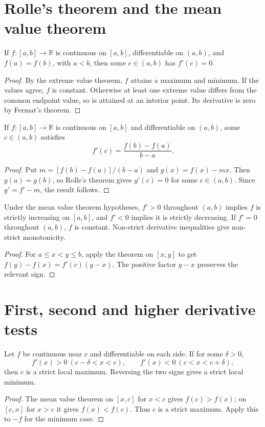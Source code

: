 \section{Rolle's theorem and the mean value theorem}
\begin{theorem}
If $f:[a,b]\to\mathbb R$ is continuous on $[a,b]$, differentiable on
$(a,b)$, and $f(a)=f(b)$, with $a<b$, then some $c\in(a,b)$ has $f'(c)=0$.
\end{theorem}
\begin{proof}
By the extreme value theorem, $f$ attains a maximum and minimum.
If the values agree, $f$ is constant. Otherwise at least one extreme
value differs from the common endpoint value, so is attained at an
interior point. Its derivative is zero by Fermat's theorem.
\end{proof}

\begin{theorem}\label{thm:analysis-mvt}
If $f:[a,b]\to\mathbb R$ is continuous on $[a,b]$ and differentiable on
$(a,b)$, some $c\in(a,b)$ satisfies
\[
f'(c)=\frac{f(b)-f(a)}{b-a}.
\]
\end{theorem}
\begin{proof}
Put $m=[f(b)-f(a)]/(b-a)$ and $g(x)=f(x)-mx$.
Then $g(a)=g(b)$, so Rolle's theorem gives $g'(c)=0$ for some $c\in(a,b)$.
Since $g'=f'-m$, the result follows.
\end{proof}

\begin{corollary}
Under the mean value theorem hypotheses, $f'>0$ throughout $(a,b)$ implies
$f$ is strictly increasing on $[a,b]$, and $f'<0$ implies it is strictly
decreasing. If $f'=0$ throughout $(a,b)$, $f$ is constant.
Non-strict derivative inequalities give non-strict monotonicity.
\end{corollary}
\begin{proof}
For $a\leq x<y\leq b$, apply the theorem on $[x,y]$ to get
$f(y)-f(x)=f'(c)(y-x)$. The positive factor $y-x$ preserves the relevant sign.
\end{proof}

\section{First, second and higher derivative tests}
\begin{theorem}
Let $f$ be continuous near $c$ and differentiable on each side.
If for some $\delta>0$,
\[
f'(x)>0\ (c-\delta<x<c),\qquad f'(x)<0\ (c<x<c+\delta),
\]
then $c$ is a strict local maximum. Reversing the two signs gives a
strict local minimum.
\end{theorem}
\begin{proof}
The mean value theorem on $[x,c]$ for $x<c$ gives $f(c)>f(x)$;
on $[c,x]$ for $x>c$ it gives $f(x)<f(c)$. Thus $c$ is a strict maximum.
Apply this to $-f$ for the minimum case.
\end{proof}

